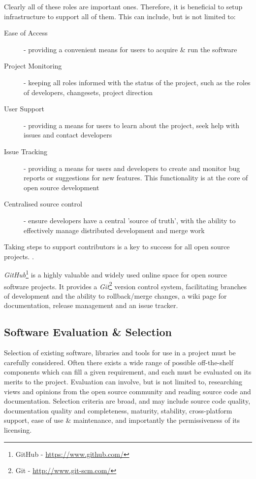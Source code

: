 Clearly all of these roles are important ones. Therefore, it is beneficial to setup infrastructure to support all of them. This can include, but is not limited to:
\begin{description}
	\item[Ease of Access] - providing a convenient means for users to acquire \& run the software
	\item[Project Monitoring] - keeping all roles informed with the status of the project, such as the roles of developers, changesets, project direction
	\item[User Support] - providing a means for users to learn about the project, seek help with issues and contact developers
	\item[Issue Tracking] - providing a means for users and developers to create and monitor bug reports or suggestions for new features. This functionality is at the core of open source development
	\item[Centralised source control] - ensure developers have a central 'source of truth', with the ability to effectively manage distributed development and merge work
\end{description}

Taking steps to support contributors is a key to success for all open source projects. \cite{openSource2}. 

\textit{GitHub}\footnote{GitHub - \url{https://www.github.com/}} is a highly valuable and widely used online space for open source software projects. It provides a \textit{Git}\footnote{Git - \url{http://www.git-scm.com/}} version control system, facilitating branches of development and the ability to rollback/merge changes, a wiki page for documentation, release management and an issue tracker.

\vspace{0.5 cm}

\subsection{Software Evaluation \& Selection}

Selection of existing software, libraries and tools for use in a project must be carefully considered. Often there exists a wide range of possible off-the-shelf components which can fill a given requirement, and each must be evaluated on its merits to the project. Evaluation can involve, but is not limited to, researching views and opinions from the open source community and reading source code and documentation. Selection criteria are broad, and may include source code quality, documentation quality and completeness, maturity, stability, cross-platform support, ease of use \& maintenance, and importantly the permissiveness of its licensing. \cite{openSource}
\\

